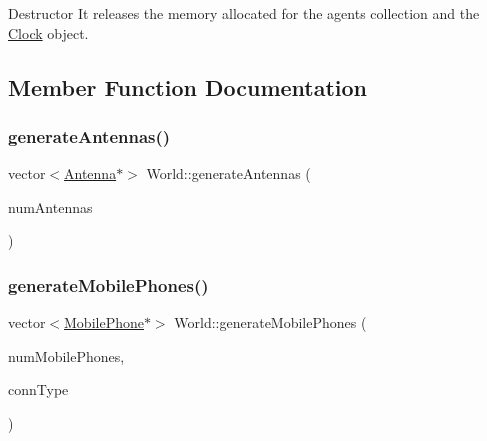 Destructor It releases the memory allocated for the agents collection and the \hyperlink{class_clock}{Clock} object. 

\subsection{Member Function Documentation}
\mbox{\label{class_world_adbd58c8093be1ac349d929d9a4bc2ab0}} 
\subsubsection{\texorpdfstring{generate\+Antennas()}{generateAntennas()}}
{\footnotesize\ttfamily vector$<$\hyperlink{class_antenna}{Antenna}$\ast$$>$ World\+::generate\+Antennas (\begin{DoxyParamCaption}\item[{unsigned long}]{num\+Antennas }\end{DoxyParamCaption})\hspace{0.3cm}{\ttfamily [private]}}

\mbox{\label{class_world_a9ba6bd08d85c5f610ea30bf4f74b925d}} 
\subsubsection{\texorpdfstring{generate\+Mobile\+Phones()}{generateMobilePhones()}}
{\footnotesize\ttfamily vector$<$\hyperlink{class_mobile_phone}{Mobile\+Phone}$\ast$$>$ World\+::generate\+Mobile\+Phones (\begin{DoxyParamCaption}\item[{int}]{num\+Mobile\+Phones,  }\item[{\hyperlink{class_holdable_agent_ae2c334b004d7b9c5a999cf2618e4e518}{Holdable\+Agent\+::\+C\+O\+N\+N\+E\+C\+T\+I\+O\+N\+\_\+\+T\+Y\+PE}}]{conn\+Type }\end{DoxyParamCaption})\hspace{0.3cm}{\ttfamily [private]}}

\mbox{\label{class_world_ada780d7d546a1dad038c83aad3f696df}} 
